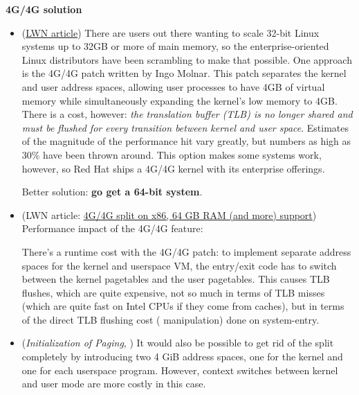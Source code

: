 \textbf{4G/4G solution}
\begin{itemize}
\item (\href{http://lwn.net/Articles/75174/}{LWN article}) There are users out there
  wanting to scale 32-bit Linux systems up to 32GB or more of main memory, so the
  enterprise-oriented Linux distributors have been scrambling to make that possible. One
  approach is the 4G/4G patch written by Ingo Molnar. This patch separates the kernel and
  user address spaces, allowing user processes to have 4GB of virtual memory while
  simultaneously expanding the kernel's low memory to 4GB. There is a cost, however:
  \emph{the translation buffer (TLB) is no longer shared and must be flushed for every
    transition between kernel and user space}. Estimates of the magnitude of the
  performance hit vary greatly, but numbers as high as 30\% have been thrown around. This
  option makes some systems work, however, so Red Hat ships a 4G/4G kernel with its
  enterprise offerings.

  Better solution: \textbf{go get a 64-bit system}.
\item (LWN article: \href{http://lwn.net/Articles/39283/}{4G/4G split on x86, 64 GB RAM
    (and more) support}) Performance impact of the 4G/4G feature:
  
  There's a runtime cost with the 4G/4G patch: to implement separate address spaces for
  the kernel and userspace VM, the entry/exit code has to switch between the kernel
  pagetables and the user pagetables. This causes TLB flushes, which are quite expensive,
  not so much in terms of TLB misses (which are quite fast on Intel CPUs if they come from
  caches), but in terms of the direct TLB flushing cost ( manipulation) done on
  system-entry. 
\item (\emph{Initialization of Paging}, \cite[Sec 3.4.2, p175]{mauerer2008professional})
  It would also be possible to get rid of the split completely by introducing two 4 GiB
  address spaces, one for the kernel and one for each userspace program. However, context
  switches between kernel and user mode are more costly in this case.
\end{itemize}

